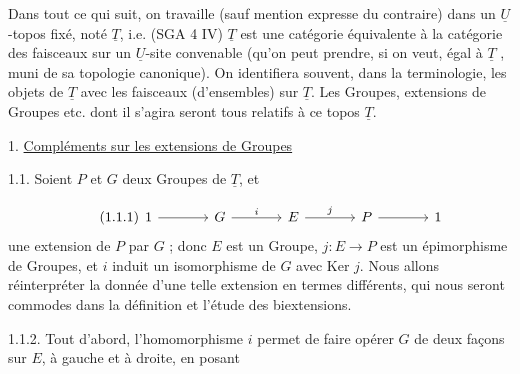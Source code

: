 Dans tout ce qui suit, on travaille (sauf mention expresse du contraire) dans un $\underline{U}$-topos fixé, noté $\underline{T}$, i.e. (SGA 4 IV) $\underline{T}$ est une catégorie équivalente à la catégorie des faisceaux sur un $\underline{U}$-site convenable (qu'on peut prendre, si on veut, égal à $\underline{T}$ , muni de sa topologie canonique). On identifiera souvent, dans la terminologie, les objets de $\underline{T}$ avec les faisceaux (d'ensembles) sur $\underline{T}$. Les Groupes, extensions de Groupes etc. dont il s'agira seront tous relatifs à ce topos $\underline{T}$.


1. \underline{Compléments sur les extensions de Groupes}

1.1.   Soient $P$ et $G$ deux Groupes de $\underline{T}$, et

\begin{equation}\tag{1.1.1}
\begin{tikzcd}[column sep=large]
1 \arrow[r] & G \arrow[r, "i"] & E \arrow[r, "j"] & P \arrow[r] & 1
\end{tikzcd}
\end{equation}
une extension de $P$ par $G$ ; donc $E$ est un Groupe, $j : E \longrightarrow P$ est un épimorphisme de Groupes, et $i$ induit un isomorphisme de $G$ avec Ker $j$. Nous allons réinterpréter la donnée d'une telle extension en termes différents, qui nous seront commodes dans la définition et l'étude des biextensions.



1.1.2.  Tout d'abord, l'homomorphisme $i$ permet de faire opérer $G$ de deux façons sur $E$, à gauche et à droite, en posant

